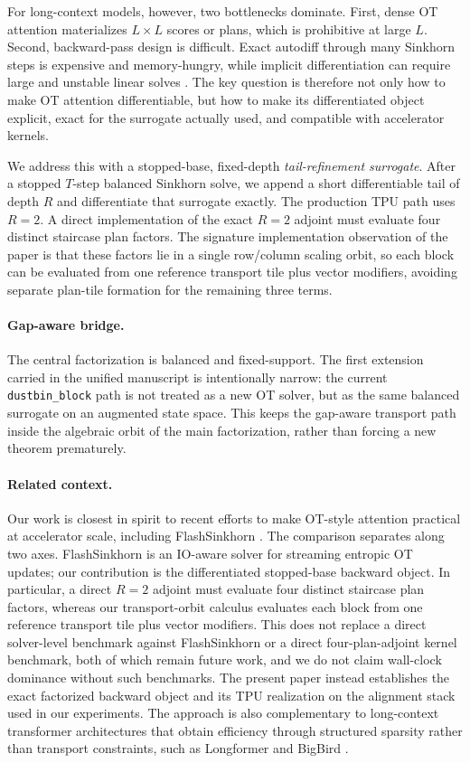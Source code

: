 \documentclass{article}
\begin{document}
For long-context models, however, two bottlenecks dominate. First, dense OT attention materializes $L\times L$ scores or plans, which is prohibitive at large $L$. Second, backward-pass design is difficult. Exact autodiff through many Sinkhorn steps is expensive and memory-hungry, while implicit differentiation can require large and unstable linear solves \citep{luise2018differential, bai2019deep}. The key question is therefore not only how to make OT attention differentiable, but how to make its differentiated object explicit, exact for the surrogate actually used, and compatible with accelerator kernels.

We address this with a stopped-base, fixed-depth \emph{tail-refinement surrogate}. After a stopped $T$-step balanced Sinkhorn solve, we append a short differentiable tail of depth $R$ and differentiate that surrogate exactly. The production TPU path uses $R=2$. A direct implementation of the exact $R=2$ adjoint must evaluate four distinct staircase plan factors. The signature implementation observation of the paper is that these factors lie in a single row/column scaling orbit, so each block can be evaluated from one reference transport tile plus vector modifiers, avoiding separate plan-tile formation for the remaining three terms.

\paragraph{Gap-aware bridge.}
The central factorization is balanced and fixed-support. The first extension carried in the unified manuscript is intentionally narrow: the current \texttt{dustbin\_block} path is not treated as a new OT solver, but as the same balanced surrogate on an augmented state space. This keeps the gap-aware transport path inside the algebraic orbit of the main factorization, rather than forcing a new theorem prematurely.

\paragraph{Related context.}
Our work is closest in spirit to recent efforts to make OT-style attention practical at accelerator scale, including FlashSinkhorn \citep{flashsinkhorn2026}. The comparison separates along two axes. FlashSinkhorn is an IO-aware solver for streaming entropic OT updates; our contribution is the differentiated stopped-base backward object. In particular, a direct $R=2$ adjoint must evaluate four distinct staircase plan factors, whereas our transport-orbit calculus evaluates each block from one reference transport tile plus vector modifiers. This does not replace a direct solver-level benchmark against FlashSinkhorn or a direct four-plan-adjoint kernel benchmark, both of which remain future work, and we do not claim wall-clock dominance without such benchmarks. The present paper instead establishes the exact factorized backward object and its TPU realization on the alignment stack used in our experiments. The approach is also complementary to long-context transformer architectures that obtain efficiency through structured sparsity rather than transport constraints, such as Longformer \citep{beltagy2020longformer} and BigBird \citep{zaheer2020bigbird}.
\end{document}
